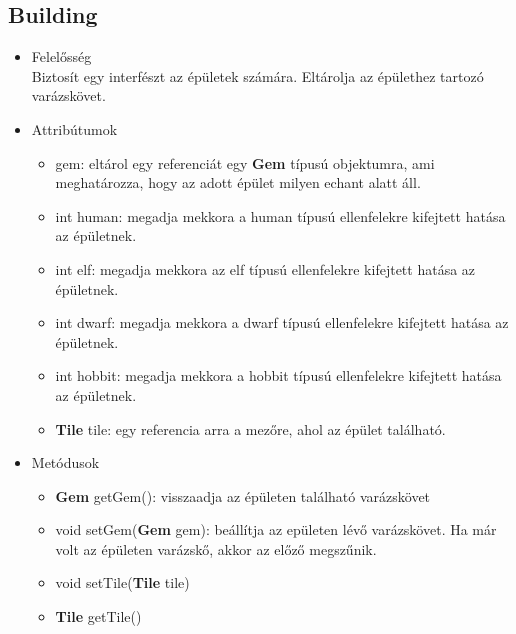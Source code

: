 \subsection{Building}
\begin{itemize}
\item Felelősség\\
Biztosít egy interfészt az épületek számára. Eltárolja az épülethez tartozó varázskövet.
\item Attribútumok
	\begin{itemize}
		\item gem: eltárol egy referenciát egy \textbf{Gem} típusú objektumra, ami meghatározza, hogy az adott épület milyen echant alatt áll.
		\item int human: megadja mekkora a human típusú ellenfelekre kifejtett hatása az épületnek.
		\item int elf: megadja mekkora az elf típusú ellenfelekre kifejtett hatása az épületnek.
		\item int dwarf: megadja mekkora a dwarf típusú ellenfelekre kifejtett hatása az épületnek.
		\item int hobbit: megadja mekkora a hobbit típusú ellenfelekre kifejtett hatása az épületnek.
		\item \textbf{Tile} tile: egy referencia arra a mezőre, ahol az épület található.
	\end{itemize}
\item Metódusok\\
	\begin{itemize}
		\item \textbf{Gem} getGem(): visszaadja az épületen található varázskövet
		\item void setGem(\textbf{Gem} gem): beállítja az epületen lévő varázskövet. Ha már volt az épületen varázskő, akkor az előző megszűnik.
		\item void setTile(\textbf{Tile} tile)
		\item \textbf{Tile} getTile()
	\end{itemize}
\end{itemize}


